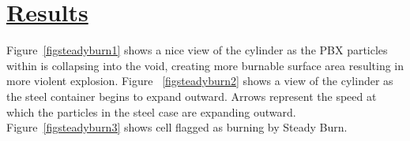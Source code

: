 \newpage

\section*{\underline{Results}}

Figure~\ref{figsteadyburn1} shows a nice view of the cylinder as the
PBX particles within is collapsing into the void, creating more
burnable surface area resulting in more violent explosion.  Figure
~\ref{figsteadyburn2} shows a view of the cylinder as the steel
container begins to expand outward.  Arrows represent the speed at
which the particles in the steel case are expanding outward.
Figure~\ref{figsteadyburn3} shows cell flagged as burning by Steady
Burn.








\begin{figure}
  \centering
  \vspace{-40pt}
  \hspace{10pt}
  \hspace{10pt}
  
  \caption{}
  \label{}
  

\end{figure}


